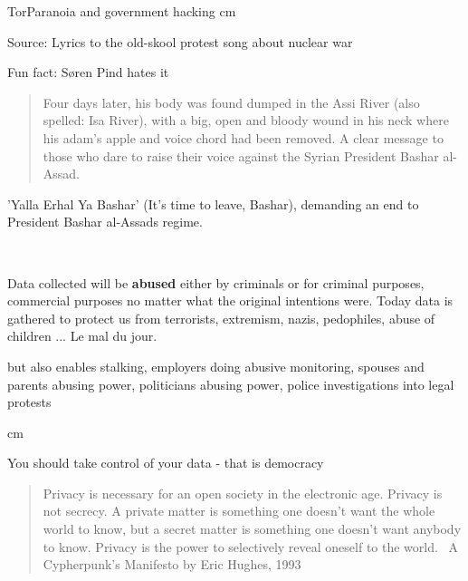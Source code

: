 \documentclass[20pt,landscape,a4paper,footrule]{foils}
\begin{document}
\mytitlepage
{Tor}{Paranoia and government hacking}
 cm







Source: Lyrics to the old-skool protest song about nuclear war\\

\centerline{Fun fact: Søren Pind hates it \smiley}


\begin{quote}
Four days later, his body was found dumped in the Assi River (also spelled: Isa River), with a big, open and bloody wound in his neck where his adam's apple and voice chord had been removed. A clear message to those who dare to raise their voice against the Syrian President Bashar al-Assad.
\end{quote}

'Yalla Erhal Ya Bashar' (It's time to leave, Bashar), demanding an end to President Bashar al-Assads regime.

\\




Data collected will be {\bf abused} either by criminals or for criminal purposes, commercial purposes no matter what the original intentions were. Today data is gathered to protect us from terrorists, extremism, nazis, pedophiles, abuse of children  ... Le mal du jour.

but also enables stalking, employers doing abusive monitoring, spouses and parents abusing power, politicians abusing power, police investigations into legal protests

 cm
\centerline{\Large You should take control of your data - that is democracy}





\begin{quote}
	Privacy is necessary for an open society in the electronic age. Privacy is not secrecy. A private matter is something one doesn't want the whole world to know, but a secret matter is something one doesn't want anybody to know. Privacy is the power to selectively reveal oneself to the world. ~A Cypherpunk's Manifesto by Eric Hughes, 1993
\end{quote}
\end{document}
